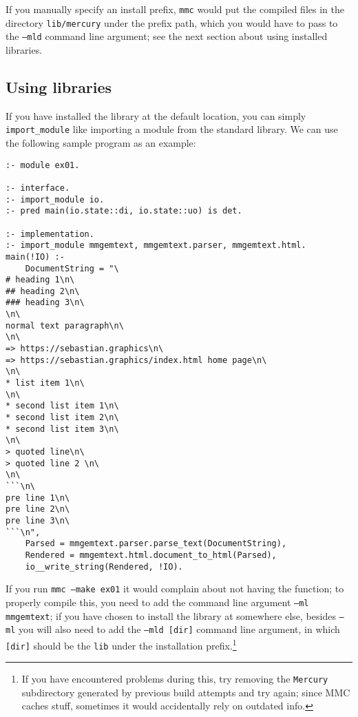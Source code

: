 If you manually specify an install prefix, \texttt{mmc} would put the compiled files in the directory \texttt{lib/mercury} under the prefix path, which you would have to pass to the \texttt{--mld} command line argument; see the next section about using installed libraries.

\subsection{Using libraries}

If you have installed the library at the default location, you can simply \texttt{import_module} like importing a module from the standard library. We can use the following sample program as an example:

\begin{lstlisting}[language=Mercury]
:- module ex01.

:- interface.
:- import_module io.
:- pred main(io.state::di, io.state::uo) is det.

:- implementation.
:- import_module mmgemtext, mmgemtext.parser, mmgemtext.html.
main(!IO) :-
	DocumentString = "\
# heading 1\n\
## heading 2\n\
### heading 3\n\
\n\
normal text paragraph\n\
\n\
=> https://sebastian.graphics\n\
=> https://sebastian.graphics/index.html home page\n\
\n\
* list item 1\n\
\n\
* second list item 1\n\
* second list item 2\n\
* second list item 3\n\
\n\
> quoted line\n\
> quoted line 2 \n\
\n\
```\n\
pre line 1\n\
pre line 2\n\
pre line 3\n\
```\n",
	Parsed = mmgemtext.parser.parse_text(DocumentString),
    Rendered = mmgemtext.html.document_to_html(Parsed),
	io__write_string(Rendered, !IO).
\end{lstlisting}

If you run \texttt{mmc --make ex01} it would complain about not having the function; to properly compile this, you need to add the command line argument \texttt{--ml mmgemtext}; if you have chosen to install the library at somewhere else, besides \texttt{--ml} you will also need to add the \texttt{--mld [dir]} command line argument, in which \texttt{[dir]} should be the \texttt{lib\mercury} under the installation prefix.\footnote{If you have encountered problems during this, try removing the \texttt{Mercury} subdirectory generated by previous build attempts and try again; since MMC caches stuff, sometimes it would accidentally rely on outdated info.}


